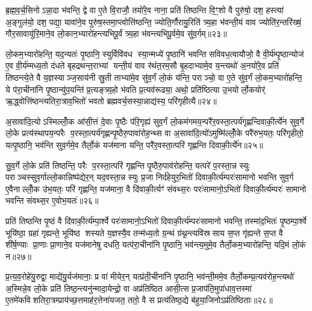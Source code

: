 ब्र॒ह्म॒व॒र्च॒सिनोऽन्ना॒दा भ॑वन्ति॒ द्वे वा ए॒ते वि॒राजौ॒ तयो॑रे॒व नाना॒ प्रति॑ तिष्ठन्ति वि॒ꣳ॒शो वै पुरु॑षो॒ दश॒ हस्त्या॑ अ॒ङ्गुल॑यो॒ दश॒ पद्या॒ यावा॑ने॒व पुरु॑ष॒स्तमा॒प्त्वोत्ति॑ष्ठन्ति॒ ज्योति॒र्गौरायु॒रिति॑ त्र्य॒हा भ॑वन्ती॒यं वाव ज्योति॑र॒न्तरि॑ख्षं॒ गौर॒सावायु॑रि॒माने॒व लो॒कान॒भ्यारो॑हन्त्यभिपू॒र्वं त्र्य॒हा भ॑वन्त्यभिपू॒र्वमे॒व सु॑व॒र्गम्॥२३॥

लो॒कम॒भ्यारो॑हन्ति॒ यद॒न्यतः॑ पृ॒ष्ठानि॒ स्युर्विवि॑वध स्या॒न्मध्ये॑ पृ॒ष्ठानि॑ भवन्ति सविवध॒त्वायौजो॒ वै वी॒र्य॑म्पृ॒ष्ठान्योज॑ ए॒व वी॒र्य॑म्मध्य॒तो द॑धते बृहद्रथन्त॒राभ्यां यन्ती॒यं वाव र॑थंत॒रम॒सौ बृ॒हदाभ्यामे॒व य॒न्त्यथो॑ अ॒नयो॑रे॒व प्रति॑ तिष्ठन्त्ये॒ते वै य॒ज्ञस्याञ्ज॒साय॑नी स्रु॒ती ताभ्या॑मे॒व सु॑व॒र्गं लो॒कं य॑न्ति॒ पराञ्चो॒ वा ए॒ते सु॑व॒र्गं लो॒कम॒भ्यारो॑हन्ति॒ ये प॑रा॒चीना॑नि पृ॒ष्ठान्यु॑प॒यन्ति॑ प्र॒त्यङ्त्र्य॒हो भ॑वति प्र॒त्यव॑रूढ्या॒ अथो॒ प्रति॑ष्ठित्या उ॒भयोर्लो॒कयोर्॑ ऋ॒द्ध्वोत्ति॑ष्ठन्त्यतिरा॒त्राव॒भितो॑ भवतो ब्रह्मवर्च॒सस्या॒न्नाद्य॑स्य॒ परि॑गृहीत्यै॥२४॥

{\anuvakamend[{वृ॒ञ्ज॒ते॒ ब्रह्म॒ चान्न॑ञ्च सुव॒र्गमे॒ते सु॑व॒र्गन्त्रयो॑विशतिश्च॥९॥}]}

अ॒सावा॑दि॒त्योऽस्मिल्लोँ॒क आ॑सी॒त्तं दे॒वाः पृ॒ष्ठैः प॑रि॒गृह्य॑ सुव॒र्गं लो॒कम॑गमय॒न्परै॑र॒वस्ता॒त्पर्य॑गृह्णन्दिवाकी॒र्त्ये॑न सुव॒र्गे लो॒के प्रत्य॑स्थापय॒न्परैः प॒रस्ता॒त्पर्य॑गृह्णन्पृ॒ष्ठैरु॒पावा॑रोह॒न्थ्स वा अ॒सावा॑दि॒त्यो॑ऽमुष्मि॑ल्लोँ॒के परै॑रुभ॒यतः॒ परि॑गृहीतो॒ यत्पृ॒ष्ठानि॒ भव॑न्ति सुव॒र्गमे॒व तैर्लो॒कं यज॑माना यन्ति॒ परै॑र॒वस्ता॒त्परि॑ गृह्णन्ति दिवाकी॒र्त्ये॑न॥२५॥

सु॒व॒र्गे लो॒के प्रति॑ तिष्ठन्ति॒ परैः प॒रस्ता॒त्परि॑ गृह्णन्ति पृ॒ष्ठैरु॒पाव॑रोहन्ति॒ यत्परे॑ प॒रस्ता॒न्न स्युः पराञ्चस्सुव॒र्गाल्लो॒कान्निष्प॑द्येर॒न् यद॒वस्ता॒न्न स्युः प्र॒जा निर्द॑हेयुर॒भितो॑ दिवाकी॒र्त्य॑म्परः॑सामानो भवन्ति सुव॒र्ग ए॒वैनाल्लोँ॒क उ॑भ॒यतः॒ परि॑ गृह्णन्ति॒ यज॑माना॒ वै दि॑वाकी॒र्त्यꣳ॑ संवथ्स॒रः परः॑सामानो॒ऽभितो॑ दिवाकी॒र्त्य॑म्परः॑ सामानो भवन्ति संवथ्स॒र ए॒वोभ॒यतः॑॥२६॥

प्रति॑ तिष्ठन्ति पृ॒ष्ठं वै दि॑वाकी॒र्त्य॑म्पा॒र्श्वे परः॑सामानो॒ऽभितो॑ दिवाकी॒र्त्य॑म्परः॑सामानो भवन्ति॒ तस्मा॑द॒भितः॑ पृ॒ष्ठम्पा॒र्श्वे भूयि॑ष्ठा॒ ग्रहा॑ गृह्यन्ते॒ भूयि॑ष्ठ शस्यते य॒ज्ञस्यै॒व तन्म॑ध्य॒तो ग्र॒न्थं ग्र॑थ्न॒न्त्यवि॑स्रसाय स॒प्त गृ॑ह्यन्ते स॒प्त वै शी॑र्\mbox{}ष॒ण्याः प्रा॒णाः प्रा॒णाने॒व यज॑मानेषु दधति॒ यत्प॑रा॒चीना॑नि पृ॒ष्ठानि॒ भव॑न्त्य॒मुमे॒व तैर्लो॒कम॒भ्यारो॑हन्ति॒ यदि॒मं लो॒कं न॥२७॥

प्र॒त्य॒व॒रोहे॑यु॒रुद्वा॒ माद्ये॑यु॒र्यज॑मानाः॒ प्र वा॑ मीयेर॒न् यत्प्र॑ती॒चीना॑नि पृ॒ष्ठानि॒ भव॑न्ती॒ममे॒व तैर्लो॒कम्प्र॒त्यव॑रोह॒न्त्यथो॑ अ॒स्मिन्ने॒व लो॒के प्रति॑ तिष्ठ॒न्त्यनु॑न्मादा॒येन्द्रो॒ वा अप्र॑तिष्ठित आसी॒त्स प्र॒जाप॑ति॒मुपा॑धाव॒त्तस्मा॑ ए॒तमे॑कविशतिरा॒त्रम्प्राय॑च्छ॒त्तमाह॑र॒त्तेना॑यजत॒ ततो॒ वै स प्रत्य॑तिष्ठ॒द्ये ब॑हुया॒जिनोऽप्र॑तिष्ठिताः॥२८॥

